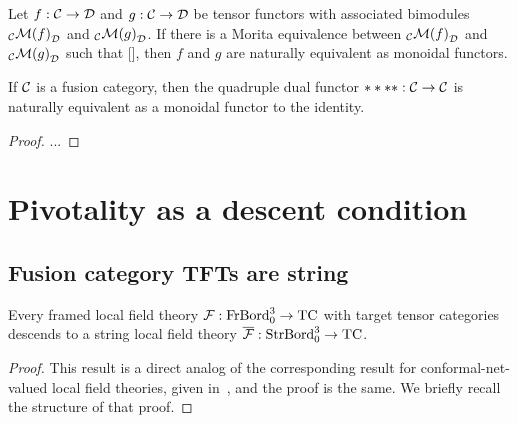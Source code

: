 \documentclass{amsart}
\begin{document}
\begin{lemma}
Let $f: \mathcal C \rightarrow \mathcal D$ and $g: \mathcal C \rightarrow \mathcal D$ be tensor functors with associated bimodules ${}_{\mathcal C} {\mathcal M(f)}_{\mathcal D}$ and ${}_{\mathcal C} {\mathcal M(g)}_{\mathcal D}$.  If there is a Morita equivalence between ${}_{\mathcal C} {\mathcal M(f)}_{\mathcal D}$ and ${}_{\mathcal C} {\mathcal M(g)}_{\mathcal D}$ such that [], then $f$ and $g$ are naturally equivalent as monoidal functors.
\end{lemma}

\begin{theorem} \label{thm-quaddual}
If $\mathcal C$ is a fusion category, then the quadruple dual functor $****: \mathcal C \rightarrow \mathcal C$ is naturally equivalent as a monoidal functor to the identity.
\end{theorem}

\begin{proof}
...
\end{proof}




\section{Pivotality as a descent condition} \label{sec-pivot}

\subsection{Fusion category TFTs are string} \label{sec-pivot-string}

\begin{proposition} \label{prop-string}
Every framed local field theory $\mathcal F : \mathrm{FrBord}_0^3 \rightarrow \mathrm{TC}$ with target tensor categories descends to a string local field theory $\overline{\mathcal F} : \mathrm{StrBord}_0^3 \rightarrow \mathrm{TC}$.
\end{proposition}

\begin{proof}
This result is a direct analog of the corresponding result for conformal-net-valued local field theories, given in~\cite{bdh-lft}, and the proof is the same.  We briefly recall the structure of that proof.  
\end{proof}
\end{document}
